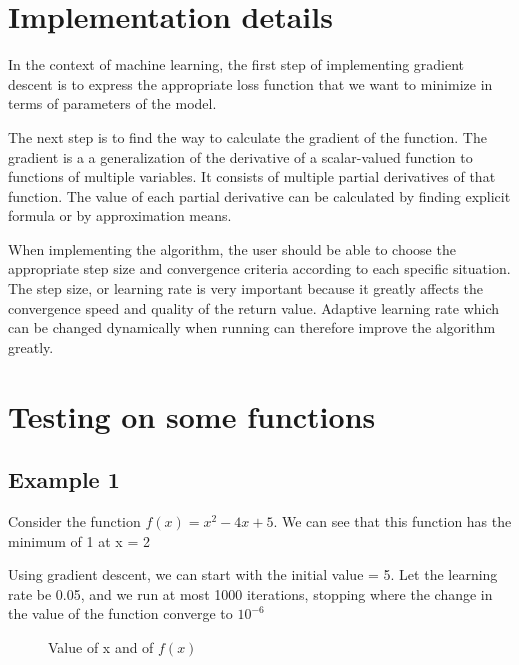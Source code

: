 \documentclass{article}
\begin{document}
\section{Implementation details}
In the context of machine learning, the first step of implementing gradient descent is to express the appropriate loss function that we want to minimize in terms of parameters of the model.

The next step is to find the way to calculate the gradient of the function. The gradient is a  a generalization of the derivative of a scalar-valued function to functions of multiple variables. It consists of multiple partial derivatives of that function. The value of each partial derivative can be calculated by finding explicit formula or by approximation means.

When implementing the algorithm, the user should be able to choose the appropriate step size and convergence criteria according to each specific situation. The step size, or learning rate is very important because it greatly affects the convergence speed and quality of the return value. Adaptive learning rate which can be changed dynamically when running can therefore improve the algorithm greatly.

\section{Testing on some functions}
\subsection{Example 1}

Consider the function $f(x) = x^2 - 4x + 5$. We can see that this function has the minimum of 1 at x = 2 

Using gradient descent, we can start with the initial value = 5. Let the learning rate be 0.05, and we run at most 1000 iterations, stopping where the change in the value of the function converge to $10^{-6}$

\begin{figure}[H]
    \centering
    \caption{Value of x and of $f(x)$}
    \label{fig:example}
\end{figure}
\end{document}
